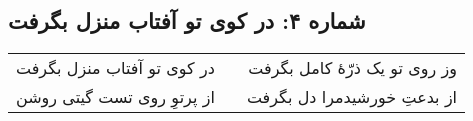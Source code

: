 \begin{center}
\section*{شماره ۴: در کوی تو آفتاب منزل بگرفت}
\label{sec:004}
\begin{longtable}{l p{0.5cm} r}
در کوی تو آفتاب منزل بگرفت
&&
وز روی تو یک ذرّهٔ کامل بگرفت
\\
از پرتوِ روی تست گیتی روشن
&&
از بدعتِ خورشیدمرا دل بگرفت
\\
\end{longtable}
\end{center}
